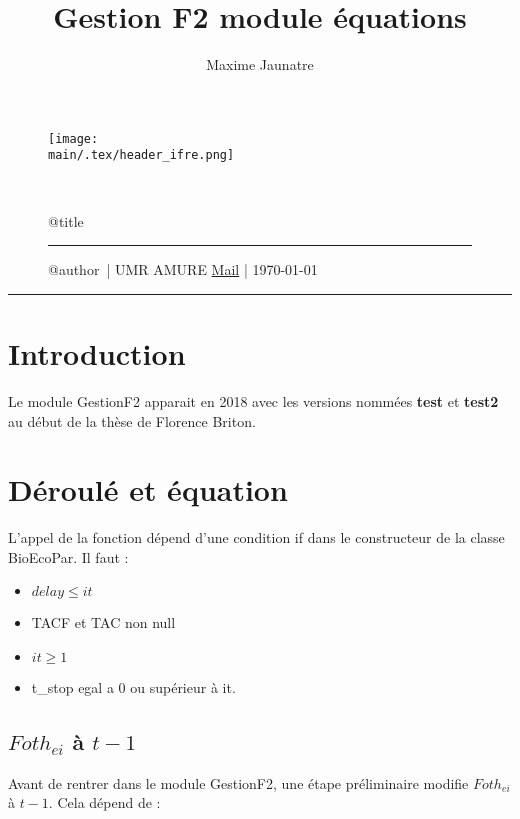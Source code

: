 \documentclass[12pt, colorinlistoftodos]{article}
\title{Gestion F2 module équations}
\author{Maxime Jaunatre}
\providecommand{\main}{.}  %
\begin{document}
\thispagestyle{plain}

\begin{figure}
    \texttt{[image: \\main/.tex/header\_ifre.png]}
    \par ~ \par
    \begin{minipage}{\textwidth}
        \begin{center}
            {\huge \csname @title\endcsname }
        \end{center}
        \rule{7em}{.4pt}\par
        \csname @author\endcsname ~| UMR AMURE \hfill %
        \href{mailto:maxime.jaunatre@ifremer.fr}{Mail} | \today
    \end{minipage}
\end{figure}
\hrule

\section{Introduction}

Le module GestionF2 apparait en 2018 avec les versions nommées \textbf{test} et \textbf{test2} au début de la thèse de Florence Briton.

\section{Déroulé et équation}

L'appel de la fonction dépend d'une condition if dans le constructeur de la classe BioEcoPar.
Il faut :

\begin{itemize}
    \item $delay \leq it$
    \item TACF et TAC non null
    \item $it \geq 1$
    \item t\_stop egal a 0 ou supérieur à it.
\end{itemize}

\subsection{$Foth_{ei}$ à $t-1$}

Avant de rentrer dans le module GestionF2, une étape préliminaire modifie $Foth_{ei}$ à $t-1$. Cela dépend de :
\end{document}
